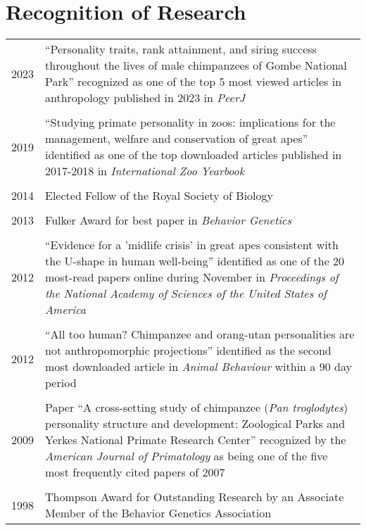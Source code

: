 \documentclass[11pt]{article}
\begin{document}
\section*{Recognition of Research}
\begin{tabular}{p{3cm}p{12cm}}
  2023 & ``Personality traits, rank attainment, and siring success
         throughout the lives of male chimpanzees of Gombe National
         Park'' recognized as one of the top 5 most viewed articles in
         anthropology published in 2023 in \textit{PeerJ} \\ \\

  2019 &  ``Studying primate personality in zoos: implications for the
         management, welfare and conservation of great apes'' identified as one
         of the top downloaded articles published in 2017-2018 in
         \textit{International Zoo Yearbook} \\ \\

  2014 & Elected Fellow of the Royal Society of Biology \\ \\

  2013 & Fulker Award for best paper in \textit{Behavior Genetics} \\ \\

  2012 & ``Evidence for a 'midlife crisis' in great apes consistent with
         the U-shape in human well-being'' identified as one of the 20
         most-read papers online during November in
         \textit{Proceedings of the National Academy of Sciences of
         the United States of America} \\ \\ 

  2012 & ``All too human? Chimpanzee and orang-utan personalities are
         not anthropomorphic projections'' identified as the second most
         downloaded article in \textit{Animal Behaviour} within a 90
         day period \\ \\

  2009 & Paper ``A cross-setting study of chimpanzee (\textit{Pan
         troglodytes}) personality structure and development: Zoological
         Parks and Yerkes National Primate Research Center'' recognized by the
         \textit{American Journal of Primatology} as being one of the five most
         frequently cited papers of 2007 \\ \\

  1998 & Thompson Award for Outstanding
         Research by an Associate Member of the Behavior Genetics Association
\end{tabular}
\end{document}
